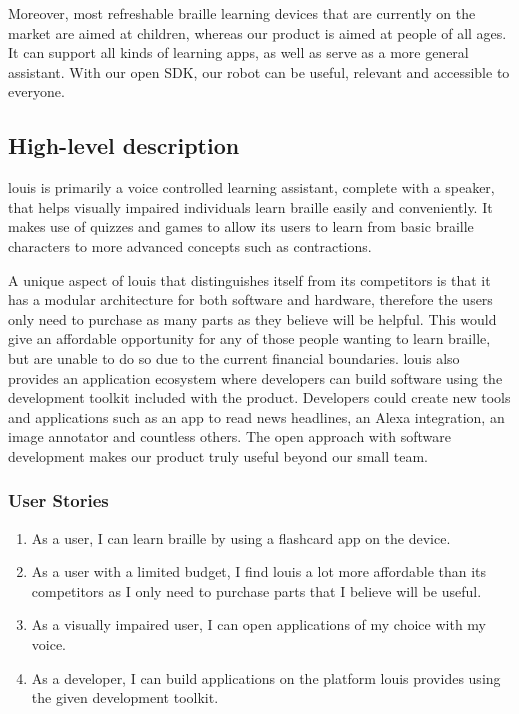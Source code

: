 \documentclass{article}
\begin{document}
Moreover, most refreshable braille learning devices that are currently on the market are aimed at children, whereas our product is aimed at people of all ages. It can support all kinds of learning apps, as well as serve as a more general assistant. With our open SDK, our robot can be useful, relevant and accessible to everyone.


\subsection{High-level description} 

louis is primarily a voice controlled learning assistant, complete with a speaker, that helps visually impaired individuals learn braille easily and conveniently. It makes use of quizzes and games to allow its users to learn from basic braille characters to more advanced concepts such as contractions.

A unique aspect of louis that distinguishes itself from its competitors is that it has a modular architecture for both software and hardware, therefore the users only need to purchase as many parts as they believe will be helpful. This would give an affordable opportunity for any of those people wanting to learn braille, but are unable to do so due to the current financial boundaries. louis also provides an application ecosystem where developers can build software using the development toolkit included with the product. Developers could create new tools and applications such as an app to read news headlines, an Alexa integration, an image annotator and countless others. The open approach with software development makes our product truly useful beyond our small team.

\subsubsection{User Stories}

\begin{enumerate}
  \item As a user, I can learn braille by using a flashcard app on the device.
  \item As a user with a limited budget, I find louis a lot more affordable than its competitors as I only need to purchase parts that I believe will be useful.
  \item As a visually impaired user, I can open applications of my choice with my voice.
  \item As a developer, I can build applications on the platform louis provides using the given development toolkit.
\end{enumerate}
\end{document}
